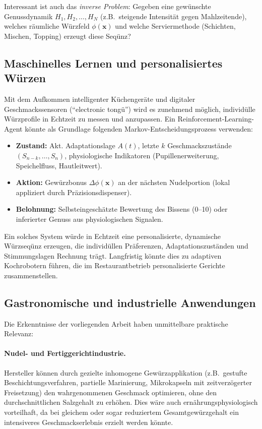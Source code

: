 ﻿\documentclass[12pt,a4paper]{article}
\theoremstyle{definition}
\newcommand{\bx}{\mathbf{x}}
\begin{document}
Interessant ist auch das \emph{inverse Problem}: Gegeben eine gewünschte
Genussdynamik $H_1, H_2, \ldots, H_N$ (z.B.\ steigende Intensität gegen
Mahlzeitende), welches räumliche Würzfeld $\phi(\bx)$ und welche
Serviermethode (Schichten, Mischen, Topping) erzeugt diese Seqünz?

\subsection{Maschinelles Lernen und personalisiertes Würzen}

Mit dem Aufkommen intelligenter Küchengeräte und digitaler
Geschmackssensoren (``electronic tongü'') wird es zunehmend möglich,
individülle Würzprofile in Echtzeit zu messen und anzupassen. Ein
Reinforcement-Learning-Agent könnte als Grundlage folgenden
Markov-Entscheidungsprozess verwenden:
\begin{itemize}
  \item \textbf{Zustand:} Akt. Adaptationslage $A(t)$, letzte $k$
    Geschmackszustände $(S_{n-k}, \ldots, S_n)$, physiologische
    Indikatoren (Pupillenerweiterung, Speichelfluss, Hautleitwert).
  \item \textbf{Aktion:} Gewürzbonus $\Delta\phi(\bx)$ an der nächsten
    Nudelportion (lokal appliziert durch Präzisionsdispenser).
  \item \textbf{Belohnung:} Selbsteingeschätzte Bewertung des Bissens
    (0--10) oder inferierter Genuss aus physiologischen Signalen.
\end{itemize}
Ein solches System würde in Echtzeit eine personalisierte, dynamische
Würzseqünz erzeugen, die individüllen Präferenzen, Adaptationszuständen
und Stimmungslagen Rechnung trägt. Langfristig könnte dies zu adaptiven
Kochrobotern führen, die im Restaurantbetrieb personalisierte Gerichte
zusammenstellen.

\subsection{Gastronomische und industrielle Anwendungen}

Die Erkenntnisse der vorliegenden Arbeit haben unmittelbare praktische
Relevanz:

\paragraph{Nudel- und Fertiggerichtindustrie.}
Hersteller können durch gezielte inhomogene Gewürzapplikation
(z.B.\ gestufte Beschichtungsverfahren, partielle Marinierung, Mikrokapseln
mit zeitverzögerter Freisetzung) den wahrgenommenen Geschmack optimieren,
ohne den durchschnittlichen Salzgehalt zu erhöhen. Dies wäre auch
ernährungsphysiologisch vorteilhaft, da bei gleichem oder sogar
reduziertem Gesamtgewürzgehalt ein intensiveres Geschmackserlebnis
erzielt werden könnte.
\end{document}
